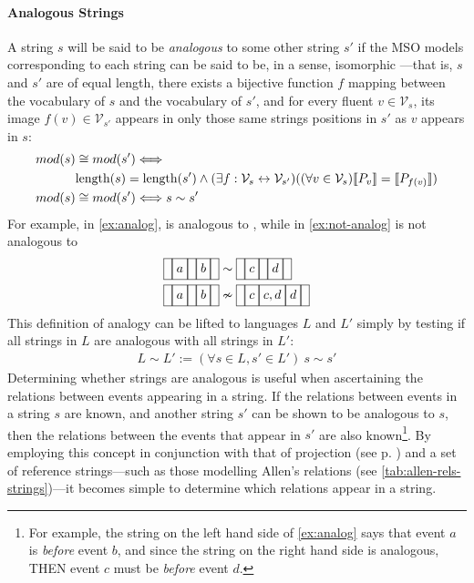 \documentclass[a4paper,12pt,leqno]{article}
\newcommand{\vph}[1]{\vphantom{#1}}
\newcommand{\ebox}[1]{\fbox{$\vph{'(),}#1$}}
\newcommand{\nbBefore}[2]{\ebox{#1}\ebox{}\ebox{#2}}
\newcommand{\nbOverlaps}[2]{\ebox{#1}\ebox{#1,#2}\ebox{#2}}
\newcommand{\Before}[2]{\ebox{}\nbBefore{#1}{#2}\ebox{}}
\newcommand{\Overlaps}[2]{\ebox{}\nbOverlaps{#1}{#2}\ebox{}}
\newcommand{\V}{\mathcal{V}}
\newcommand{\selfnote}[1]{{\color{red}[NB\footnote{{\color{red}#1}}]}}
\newcommand{\nb}{\selfnote}
\begin{document}
\paragraph{Analogous Strings}\label{para:analogous-strings}
A string $s$ will be said to be \textit{analogous} to some other string $s'$ if the MSO models corresponding to each string can be said to be, in a sense, isomorphic%
---that is, $s$ and $s'$ are of equal length, there exists a bijective function $f$ mapping between the vocabulary of $s$ and the vocabulary of $s'$, and for every fluent $v \in \V_s$, its image $f(v) \in \V_{s'}$ appears in only those same strings positions in $s'$ as $v$ appears in $s$:
\begin{align}
	mod(s) &\cong mod(s') \Longleftrightarrow \\\notag &\text{length}(s) = \text{length}(s') \land (\exists f: \V_s \leftrightarrow \V_{s'})((\forall v \in \V_s) \llbracket P_v \rrbracket = \llbracket P_{f(v)} \rrbracket)\\
	mod(s) &\cong mod(s') \Longleftrightarrow s \sim s'
\end{align}
For example, in \cref{ex:analog}, \Before{a}{b} is analogous to \Before{c}{d}, while in \cref{ex:not-analog} \Before{a}{b} is not analogous to \Overlaps{c}{d}
\begin{align}
	\Before{a}{b} &\sim \Before{c}{d}\label{ex:analog}\\
	\Before{a}{b} &\nsim \Overlaps{c}{d}\label{ex:not-analog}
\end{align}
This definition of analogy can be lifted to languages $L$ and $L'$ simply by testing if all strings in $L$ are analogous with all strings in $L'$:
\begin{align}
	L \sim L' := (\forall s \in L, s' \in L')~ s \sim s'
\end{align}
Determining whether strings are analogous is useful when ascertaining the relations between events appearing in a string. If the relations between events in a string $s$ are known, and another string $s'$ can be shown to be analogous to $s$, then the relations between the events that appear in $s'$ are also known\footnote{For example, the string on the left hand side of \cref{ex:analog} says that event $a$ is \textit{before} event $b$, and since the string on the right hand side is analogous, THEN event $c$ must be \textit{before} event $d$.}. By employing this concept in conjunction with that of projection (see p. \pageref{para:str-op-projection}) and a set of reference strings---such as those modelling Allen's relations (see \cref{tab:allen-rels-strings})---it becomes simple to determine which relations appear in a string.
\end{document}
